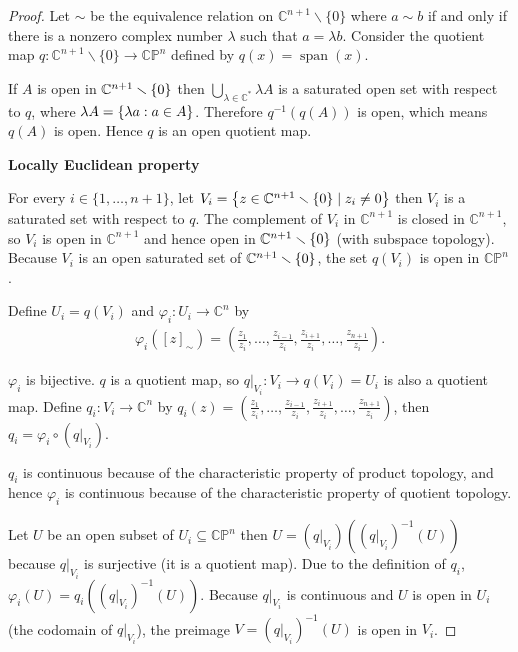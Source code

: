 \begin{proof}
    Let $\sim$ be the equivalence relation on $\mathbb{C}^{n+1}\smallsetminus\{0\}$ where $a\sim b$ if and only if there is a nonzero complex number $\lambda$ such that $a = \lambda b$. Consider the quotient map $q: \mathbb{C}^{n+1}\smallsetminus\{0\} \to \mathbb{CP}^{n}$ defined by $q(x) = \operatorname{span}(x)$.

    If $A$ is open in $\mathbb{C}^{n+1}\smallsetminus\left\{{0}\right\}$ then $\bigcup_{\lambda\in\mathbb{C}^{*}}\lambda A$ is a saturated open set with respect to $q$, where $\lambda A = \left\{{ \lambda a : a\in A }\right\}$. Therefore $q^{-1}(q(A))$ is open, which means $q(A)$ is open. Hence $q$ is an open quotient map.

    \textbf{Locally Euclidean property}

    For every $i\in \{ 1, \ldots, n+1 \}$, let $V_{i} = \left\{{ z \in \mathbb{C}^{n+1}\smallsetminus\left\{{0}\right\} \mid z_{i} \ne 0 }\right\}$ then $V_{i}$ is a saturated set with respect to $q$. The complement of $V_{i}$ in $\mathbb{C}^{n+1}$ is closed in $\mathbb{C}^{n+1}$, so $V_{i}$ is open in $\mathbb{C}^{n+1}$ and hence open in $\mathbb{C}^{n+1}\smallsetminus\left\{{0}\right\}$ (with subspace topology). Because $V_{i}$ is an open saturated set of $\mathbb{C}^{n+1}\smallsetminus\left\{{0}\right\}$, the set $q(V_{i})$ is open in $\mathbb{CP}^{n}$.

    Define $U_{i} = q(V_{i})$ and $\varphi_{i}: U_{i} \to \mathbb{C}^{n}$ by
    \begin{align*}
        \varphi_{i}({[z]}_{\sim}) = \left(\frac{z_{1}}{z_{i}}, \ldots, \frac{z_{i-1}}{z_{i}}, \frac{z_{i+1}}{z_{i}}, \ldots, \frac{z_{n+1}}{z_{i}}\right).
    \end{align*}

    $\varphi_{i}$ is bijective. $q$ is a quotient map, so $q\vert_{V_{i}}: V_{i} \to q(V_{i}) = U_{i}$ is also a quotient map. Define $q_{i}: V_{i}\to \mathbb{C}^{n}$ by $q_{i}(z) = \left( \frac{z_{1}}{z_{i}}, \ldots, \frac{z_{i-1}}{z_{i}}, \frac{z_{i+1}}{z_{i}}, \ldots, \frac{z_{n+1}}{z_{i}} \right)$, then $q_{i} = \varphi_{i} \circ (q\vert_{V_{i}})$.

    $q_{i}$ is continuous because of the characteristic property of product topology, and hence $\varphi_{i}$ is continuous because of the characteristic property of quotient topology.

    Let $U$ be an open subset of $U_{i} \subseteq \mathbb{CP}^{n}$ then $U = (q\vert_{V_{i}})({(q\vert_{V_{i}})}^{-1}(U))$ because $q\vert_{V_{i}}$ is surjective (it is a quotient map). Due to the definition of $q_{i}$, $\varphi_{i}(U) = q_{i}({(q\vert_{V_{i}})}^{-1}(U))$. Because $q\vert_{V_{i}}$ is continuous and $U$ is open in $U_{i}$ (the codomain of $q\vert_{V_{i}}$), the preimage $V = {(q\vert_{V_{i}})}^{-1}(U)$ is open in $V_{i}$.


\end{proof}
